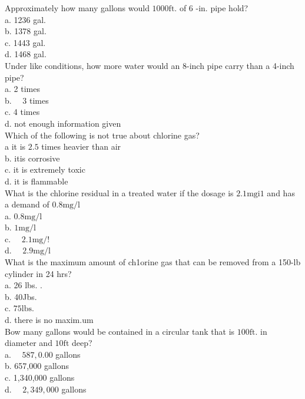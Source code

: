 Approximately how many gallons would $1000 \mathrm{ft}$. of 6 -in. pipe hold?\\
a. 1236 gal.\\
b. 1378 gal.\\
c. 1443 gal.\\
d. 1468 gal.\\

Under like conditions, how more water would an 8-inch pipe carry than a 4-inch pipe?\\
a. 2 times\\
b. $\quad 3$ times\\
c. 4 times\\
d. not enough information given\\

Which of the following is not true about chlorine gas?\\
a it is $2.5$ times heavier than air\\
b. itis corrosive\\
c. it is extremely toxic\\
d. it is flammable \\

What is the chlorine residual in a treated water if the dosage is $2.1 \mathrm{mgi1}$ and has a demand of $0.8 \mathrm{mg} / \mathrm{l}$\\
a. $0.8 \mathrm{mg} / \mathrm{l}$\\
b. $1 \mathrm{mg} / \mathrm{l}$\\
c. $\quad 2.1 \mathrm{mg} / !$\\
d. $\quad 2.9 \mathrm{mg} / \mathrm{l}$\\

What is the maximum amount of ch1orine gas that can be removed from a 150-lb cylinder in 24 hrs?\\
a. 26 lbs. .\\
b. 40Jbs.\\
c. $75 \mathrm{lbs}$.\\
d. there is no maxim.um\\

Bow many gallons would be contained in a circular tank that is $100 \mathrm{ft}$. in diameter and $10 \mathrm{ft}$ deep?\\
a. $\quad 587,0.00$ gallons\\
b. 657,000 gallons\\
c. 1,340,000 gallons\\
d. $\quad 2,349,000$ gallons\\

